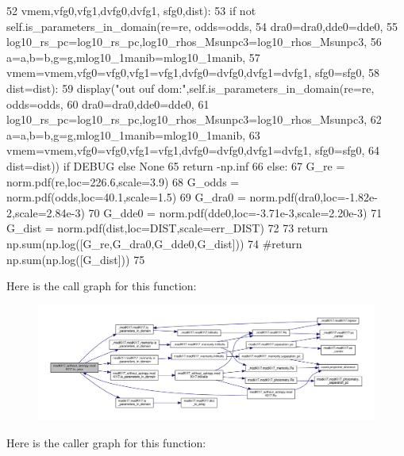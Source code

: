 \begin{DoxyCode}
52             vmem,vfg0,vfg1,dvfg0,dvfg1, sfg0,dist):
53         \textcolor{keywordflow}{if} \textcolor{keywordflow}{not} self.is\_parameters\_in\_domain(re=re, odds=odds,
54             dra0=dra0,dde0=dde0,
55             log10\_rs\_pc=log10\_rs\_pc,log10\_rhos\_Msunpc3=log10\_rhos\_Msunpc3,
56             a=a,b=b,g=g,mlog10\_1manib=mlog10\_1manib,
57             vmem=vmem,vfg0=vfg0,vfg1=vfg1,dvfg0=dvfg0,dvfg1=dvfg1, sfg0=sfg0, 
58             dist=dist):
59             display(\textcolor{stringliteral}{"out ouf dom:"},self.is\_parameters\_in\_domain(re=re, odds=odds,
60                 dra0=dra0,dde0=dde0,
61                 log10\_rs\_pc=log10\_rs\_pc,log10\_rhos\_Msunpc3=log10\_rhos\_Msunpc3,
62                 a=a,b=b,g=g,mlog10\_1manib=mlog10\_1manib,
63                 vmem=vmem,vfg0=vfg0,vfg1=vfg1,dvfg0=dvfg0,dvfg1=dvfg1, sfg0=sfg0, 
64                 dist=dist)) \textcolor{keywordflow}{if} DEBUG \textcolor{keywordflow}{else} \textcolor{keywordtype}{None}
65             \textcolor{keywordflow}{return} -np.inf
66         \textcolor{keywordflow}{else}:
67             G\_re = norm.pdf(re,loc=226.6,scale=3.9)
68             G\_odds = norm.pdf(odds,loc=40.1,scale=1.5)
69             G\_dra0 = norm.pdf(dra0,loc=-1.82e-2,scale=2.84e-3)
70             G\_dde0 = norm.pdf(dde0,loc=-3.71e-3,scale=2.20e-3)
71             G\_dist = norm.pdf(dist,loc=DIST,scale=err\_DIST)
72         
73             \textcolor{keywordflow}{return} np.sum(np.log([G\_re,G\_dra0,G\_dde0,G\_dist]))
74             \textcolor{comment}{#return np.sum(np.log([G\_dist]))}
75             
\end{DoxyCode}
Here is the call graph for this function\+:\nopagebreak
\begin{figure}[H]
\begin{center}
\leavevmode
\includegraphics[width=350pt]{d3/df4/classmodKI17__without__astropy_1_1modKI17_a4ebd2891cdc0426fcb517062f49c19d6_cgraph}
\end{center}
\end{figure}
Here is the caller graph for this function\+:\nopagebreak
